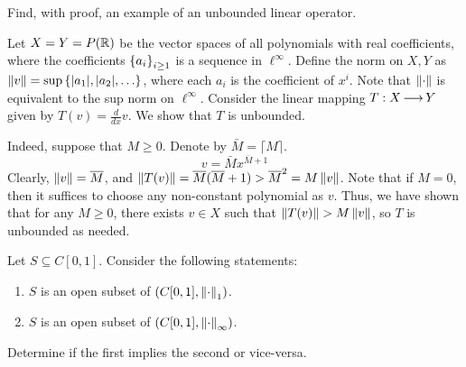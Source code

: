 \begin{qu}[num=6.4]
    Find, with proof, an example of an unbounded linear operator.
\end{qu}

\begin{soln}
    Let $ X = Y = P(\mathbb{R}) $ be the vector spaces of all polynomials with real
    coefficients, where the coefficients $ \left\{{a_{i}}\right\}_{i\geq1} $ is a sequence
    in $ \ell^{ \infty} $.
    Define the norm on $ X, Y $ as $ \left\|v\right\| = \sup \left\{{\abs{a_{1}},
    \abs{a_{2}}, \dots}\right\} $,
    where each $ a_{i} $ is the coefficient of $ x^{i} $.
    Note that $ \left\|\cdot\right\| $ is equivalent to the sup norm on
    $ \ell^{ \infty} $. \vsp
    Consider the linear mapping $ T: X \operatorname{\longrightarrow} Y $ given by $ T(v) = \frac{d}
    {dx} v $. We show that $ T $ is unbounded. \npgh
    
    Indeed, suppose that $ M \geq 0 $.
    Denote by $ \bar{M} = \lceil M \rceil $.
    \begin{equation*}
        v = \bar{M}x^{\bar{M} + 1}
    \end{equation*}
    Clearly, $ \left\|v\right\| = \overline{M} $, and
    $ \left\|T(v)\right\| = \overline{M}(\overline{M} + 1) > \overline{M}^{2}= M \left\|v\right\| $.
    Note that if $ M = 0 $, then it suffices to choose any non-constant
    polynomial as $ v $. \vsp
    Thus, we have shown that for any $ M \geq 0 $,
    there exists $ v \in X $ such that $ \left\|T(v)\right\| > M \left\|v\right\| $,
    so $ T $ is unbounded as needed.
\end{soln}


\newpage
\label{q7}
\begin{qu}[num=7]
    Let $ S \subseteq C[0, 1] $. Consider the following statements:
    \begin{enumerate}
        \item $ S $ is an open subset of $ (C[0, 1], \left\|\cdot\right\|_{1}) $.
        \item $ S $ is an open subset of $ (C[0, 1], \left\|\cdot\right\|_{\infty}) $.
    \end{enumerate}
    Determine if the first implies the second or vice-versa.
\end{qu}


